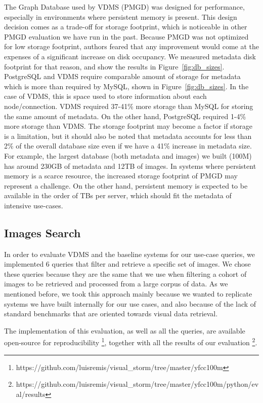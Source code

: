 The Graph Database used by VDMS (PMGD) was designed for performance,
especially in environments where persistent memory is present.
This design decision comes as a trade-off for storage footprint, which is
noticeable in other PMGD evaluation we have run in the past.
Because PMGD was not optimized for low storage footprint, authors feared that
any improvement would come at the expenses of a significant increase on
disk occupancy.
We measured metadata disk footprint for that reason, and show the results
in Figure~\ref{fig:db_sizes}.
PostgreSQL and VDMS require comparable amount of storage for metadata which
is more than required by MySQL, shown in Figure~\ref{fig:db_sizes}.
In the case of VDMS, this is space used to store information about
each node/connection.
VDMS required 37-41\% more storage than MySQL for storing the same amount
of metadata. On the other hand, PostgreSQL required 1-4\% more storage than VDMS.
The storage footprint may become a factor if storage is a limitation, but
it should also be noted that metadata accounts for less than 2\% of the
overall database size even if we have a 41\% increase in metadata size.
For example, the largest database (both metadata and images) we built
(100M) has around 230GB of metadata and 12TB of images.
In systems where persistent memory is a scarce resource,
the increased storage footprint of PMGD may represent a challenge.
On the other hand, persistent memory is expected to be available
in the order of TBs per server, which should fit the
metadata of intensive use-cases\cite{IntelXPoint15}.


\subsection{Images Search}
\label{images}

In order to evaluate VDMS and the baseline systems for our use-case queries,
we implemented 6 queries that filter and retrieve a specific set of images.
We chose these queries because they are the same that we use when filtering a
cohort of images to be retrieved and processed from a large corpus of data.
As we mentioned before, we took this approach mainly because we wanted to
replicate systems we have built internally for our use cases,
and also because of the lack of standard
benchmarks that are oriented towards visual data retrieval.

The implementation of this evaluation, as well as all the queries, are available
open-source for reproducibility
\footnote{https://github.com/luisremis/visual\_storm/tree/master/yfcc100m},
together with all the results of our evaluation
\footnote{https://github.com/luisremis/visual\_storm/tree/master/yfcc100m/python/eval/results}.


